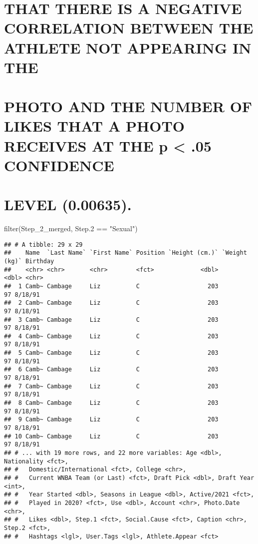 \documentclass[
]{article}
\newenvironment{Shaded}{\begin{snugshade}}{\end{snugshade}}
\newcommand{\FloatTok}[1]{\textcolor[rgb]{0.00,0.00,0.81}{#1}}
\newcommand{\FunctionTok}[1]{\textcolor[rgb]{0.00,0.00,0.00}{#1}}
\newcommand{\NormalTok}[1]{#1}
\newcommand{\SpecialCharTok}[1]{\textcolor[rgb]{0.00,0.00,0.00}{#1}}
\newcommand{\StringTok}[1]{\textcolor[rgb]{0.31,0.60,0.02}{#1}}
\begin{document}
\hypertarget{that-there-is-a-negative-correlation-between-the-athlete-not-appearing-in-the}{%
\section{THAT THERE IS A NEGATIVE CORRELATION BETWEEN THE ATHLETE NOT
APPEARING IN
THE}\label{that-there-is-a-negative-correlation-between-the-athlete-not-appearing-in-the}}

\hypertarget{photo-and-the-number-of-likes-that-a-photo-receives-at-the-p-.05-confidence}{%
\section{PHOTO AND THE NUMBER OF LIKES THAT A PHOTO RECEIVES AT THE p
\textless{} .05
CONFIDENCE}\label{photo-and-the-number-of-likes-that-a-photo-receives-at-the-p-.05-confidence}}

\hypertarget{level-0.00635.}{%
\section{LEVEL (0.00635).}\label{level-0.00635.}}

\begin{Shaded}
\begin{Highlighting}[]
\FunctionTok{filter}\NormalTok{(Step\_2\_merged, Step}\FloatTok{.2} \SpecialCharTok{==} \StringTok{"Sexual"}\NormalTok{)}
\end{Highlighting}
\end{Shaded}

\begin{verbatim}
## # A tibble: 29 x 29
##    Name  `Last Name` `First Name` Position `Height (cm.)` `Weight (kg)` Birthday
##    <chr> <chr>       <chr>        <fct>             <dbl>         <dbl> <chr>   
##  1 Camb~ Cambage     Liz          C                   203            97 8/18/91 
##  2 Camb~ Cambage     Liz          C                   203            97 8/18/91 
##  3 Camb~ Cambage     Liz          C                   203            97 8/18/91 
##  4 Camb~ Cambage     Liz          C                   203            97 8/18/91 
##  5 Camb~ Cambage     Liz          C                   203            97 8/18/91 
##  6 Camb~ Cambage     Liz          C                   203            97 8/18/91 
##  7 Camb~ Cambage     Liz          C                   203            97 8/18/91 
##  8 Camb~ Cambage     Liz          C                   203            97 8/18/91 
##  9 Camb~ Cambage     Liz          C                   203            97 8/18/91 
## 10 Camb~ Cambage     Liz          C                   203            97 8/18/91 
## # ... with 19 more rows, and 22 more variables: Age <dbl>, Nationality <fct>,
## #   Domestic/International <fct>, College <chr>,
## #   Current WNBA Team (or Last) <fct>, Draft Pick <dbl>, Draft Year <int>,
## #   Year Started <dbl>, Seasons in League <dbl>, Active/2021 <fct>,
## #   Played in 2020? <fct>, Use <dbl>, Account <chr>, Photo.Date <chr>,
## #   Likes <dbl>, Step.1 <fct>, Social.Cause <fct>, Caption <chr>, Step.2 <fct>,
## #   Hashtags <lgl>, User.Tags <lgl>, Athlete.Appear <fct>
\end{verbatim}
\end{document}
